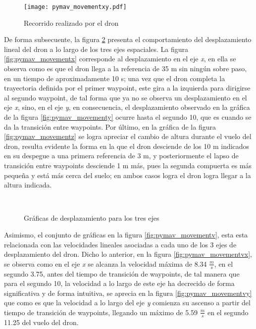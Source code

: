 \begin{figure}[ht]
    \centering
    \texttt{[image: pymav\_movementxy.pdf]}
    \caption{Recorrido realizado por el dron}
    \label{fig:pymav_movementxy}
\end{figure}

De forma subsecuente, la figura \ref{fig:pymav_movementd} presenta el comportamiento del desplazamiento lineal del dron a lo largo de los tres ejes espaciales. La figura \ref{fig:pymav_movementx} corresponde al desplazamiento en el eje \textit{x}, en ella se observa como es que el dron llega a la referencia de 35 m sin ningún sobre paso, en un tiempo de aproximadamente 10 s; una vez que el dron completa la trayectoria definida por el primer waypoint, este gira a la izquierda para dirigirse al segundo waypoint, de tal forma que ya no se observa un desplazamiento en el eje \textit{x}, sino, en el eje \textit{y}, en consecuencia, el desplazamiento observado en la gráfica de la figura \ref{fig:pymav_movementy} ocurre hasta el segundo 10, que es cuando se da la transición entre waypoints. Por último, en la gráfica de la figura \ref{fig:pymav_movementz} se logra apreciar el cambio de altura durante el vuelo del dron, resulta evidente la forma en la que el dron desciende de los 10 m indicados en su despegue a una primera referencia de 3 m, y posteriormente el lapso de transición entre waypoints desciende 1 m más, pues la segunda compuerta es más pequeña y está más cerca del suelo; en ambos casos logra el dron logra llegar a la altura indicada.

\begin{figure}[ht]
    \centering
    \hfill
    \\
    \hfill

    \caption{Gráficas de desplazamiento para los tres ejes}
    \label{fig:pymav_movementd}
\end{figure}

Asimismo, el conjunto de gráficas en la figura \ref{fig:pymav_movementv}, esta esta relacionada con las velocidades lineales asociadas a cada uno de los 3 ejes de desplazamiento del dron. Dicho lo anterior, en la figura \ref{fig:pymav_movementvx}, se observa como en el eje \textit{x} se alcanza la velocidad máxima de 8.34 $\frac{m}{s}$, en el segundo 3.75, antes del tiempo de transición de waypoints, de tal manera que para el segundo 10, la velocidad a lo largo de este eje ha decrecido de forma significativa y de forma intuitiva, se aprecia en la figura \ref{fig:pymav_movementvy} que como es que la velocidad a lo largo del eje \textit{y} comienza su ascenso a partir del tiempo de transición de waypoints, llegando un máximo de 5.59 $\frac{m}{s}$ en el segundo 11.25 del vuelo del dron. 

